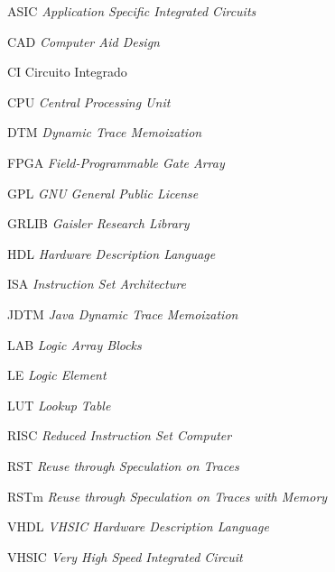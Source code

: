 \documentclass[
	11pt,				%
	openright,			%
	oneside,			%
	a4paper,			%
	english,			%
	french,				%
	spanish,			%
	brazil,				%
	]{abntex2}
\begin{document}
%
\begin{siglas}
  \item[ASIC] \textit{Application Specific Integrated Circuits}%
  \item[CAD] \textit{Computer Aid Design}
  \item[CI] Circuito Integrado
  \item[CPU] \textit{Central Processing Unit}%
  \item[DTM] \textit{Dynamic Trace Memoization}%
  \item[FPGA]  \textit{Field-Programmable Gate Array}
  \item[GPL] \textit{GNU General Public License}
  \item[GRLIB] \textit{Gaisler Research Library}
  \item[HDL] \textit{Hardware Description Language}
  \item[ISA] \textit{Instruction Set Architecture}%
  \item[JDTM] \textit{Java Dynamic Trace Memoization}%
  \item[LAB] \textit{Logic Array Blocks}
  \item[LE] \textit{Logic Element}
  \item[LUT] \textit{Lookup Table}
  \item[RISC] \textit{Reduced Instruction Set Computer}
  \item[RST] \textit{Reuse through Speculation on Traces}
  \item[RSTm] \textit{Reuse through Speculation on Traces with Memory}
  \item[VHDL] \textit{VHSIC Hardware Description Language}
  \item[VHSIC] \textit{Very High Speed Integrated Circuit}
\end{siglas}
%
\end{document}
